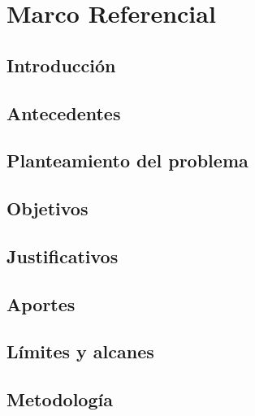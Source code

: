 \chapter{Marco Referencial}
\section{Introducci\'on}
\section{Antecedentes}
\section{Planteamiento del problema}
\section{Objetivos}
\section{Justificativos}
\section{Aportes}
\section{L\'imites y alcanes}
\section{Metodolog\'ia}

